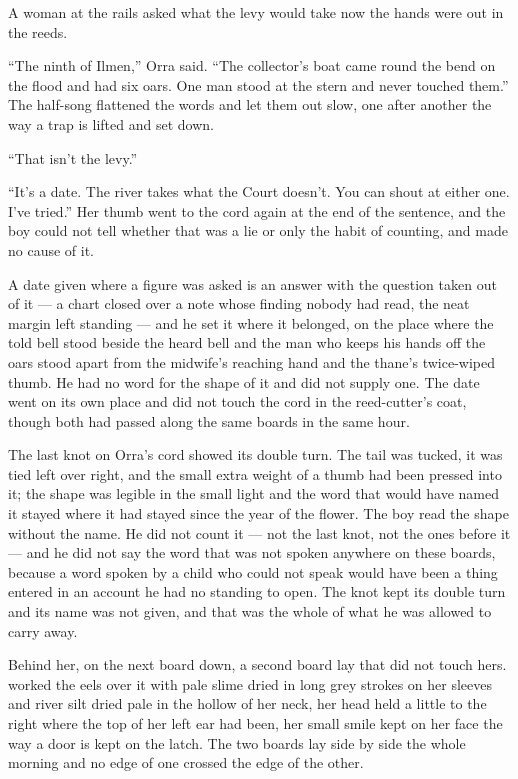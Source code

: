 A woman at the rails asked what the levy would take now the hands were out in the reeds.

“The ninth of Ilmen,” Orra said. “The collector's boat came round the bend on the flood and had six oars. One man stood at the stern and never touched them.” The half-song flattened the words and let them out slow, one after another the way a trap is lifted and set down.

“That isn't the levy.”

“It's a date. The river takes what the Court doesn't. You can shout at either one. I've tried.” Her thumb went to the cord again at the end of the sentence, and the boy could not tell whether that was a lie or only the habit of counting, and made no cause of it.

A date given where a figure was asked is an answer with the question taken out of it --- a chart closed over a note whose finding nobody had read, the neat margin left standing --- and he set it where it belonged, on the place where the told bell stood beside the heard bell and the man who keeps his hands off the oars stood apart from the midwife's reaching hand and the thane's twice-wiped thumb. He had no  word for the shape of it and did not supply one. The date went on its own place and did not touch the cord in the reed-cutter's coat, though both had passed along the same boards in the same hour.

The last knot on Orra's cord showed its double turn. The tail was tucked, it was tied left over right, and the small extra weight of a thumb had been pressed into it; the shape was legible in the small light and the word that would have named it stayed where it had stayed since the year of the flower. The boy read the shape without the name. He did not count it --- not the last knot, not the ones before it --- and he did not say the word that was not spoken anywhere on these boards, because a word spoken by a child who could not speak would have been a thing entered in an account he had no standing to open. The knot kept its double turn and its name was not given, and that was the whole of what he was allowed to carry away.

Behind her, on the next board down, a second board lay that did not touch hers.  worked the eels over it with pale slime dried in long grey strokes on her sleeves and river silt dried pale in the hollow of her neck, her head held a little to the right where the top of her left ear had been, her small smile kept on her face the way a door is kept on the latch. The two boards lay side by side the whole morning and no edge of one crossed the edge of the other.

